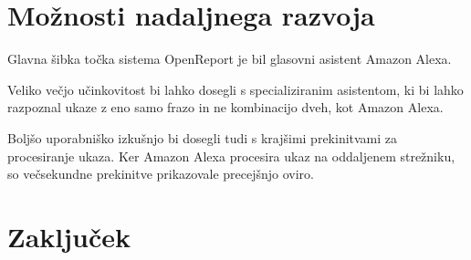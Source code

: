 \documentclass[a4paper, 12pt]{book}
\begin{document}
\chapter{Možnosti nadaljnega razvoja}

Glavna šibka točka sistema OpenReport je bil glasovni asistent Amazon Alexa.

Veliko večjo učinkovitost bi lahko dosegli s specializiranim asistentom, ki bi lahko razpoznal ukaze z eno samo frazo in ne kombinacijo dveh, kot Amazon Alexa.

Boljšo uporabniško izkušnjo bi dosegli tudi s krajšimi prekinitvami za procesiranje ukaza.
Ker Amazon Alexa procesira ukaz na oddaljenem strežniku, so večsekundne prekinitve prikazovale precejšnjo oviro.



\chapter{Zaključek}


\newpage %
\ \\
\clearpage
{}

\printbibliography
\end{document}

